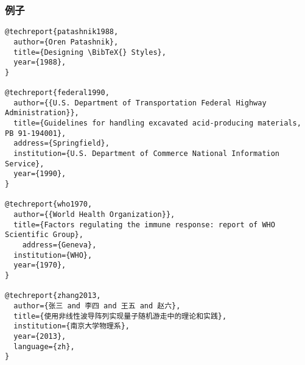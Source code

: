 \subsubsection{例子}

\begin{verbatim}
@techreport{patashnik1988,
  author={Oren Patashnik},
  title={Designing \BibTeX{} Styles},
  year={1988},
}

@techreport{federal1990,
  author={{U.S. Department of Transportation Federal Highway Administration}},
  title={Guidelines for handling excavated acid-producing materials, PB 91-194001},
  address={Springfield},
  institution={U.S. Department of Commerce National Information Service},
  year={1990},
}

@techreport{who1970,
  author={{World Health Organization}},
  title={Factors regulating the immune response: report of WHO Scientific Group},
    address={Geneva},
  institution={WHO},
  year={1970},
}

@techreport{zhang2013,
  author={张三 and 李四 and 王五 and 赵六},
  title={使用非线性波导阵列实现量子随机游走中的理论和实践},
  institution={南京大学物理系},
  year={2013},
  language={zh},
}
\end{verbatim}

